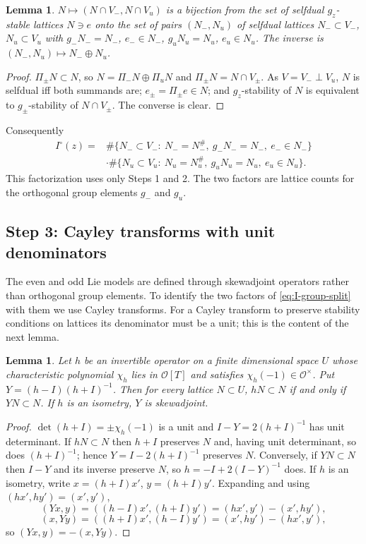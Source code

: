 \documentclass[11pt,oneside,notitlepage]{book}
\numberwithin{equation}{section}
\theoremstyle{plain}
\newtheorem{lemma}[theorem]{Lemma}
\theoremstyle{definition}
\newcommand{\cO}{\mathcal{O}}
\begin{document}
\begin{lemma}\label{lem:Nsplit}
$N\mapsto(N\cap V_-,N\cap V_u)$ is a bijection from the set of selfdual $g_z$-stable lattices $N\ni e$ onto the set of pairs $(N_-,N_u)$ of selfdual lattices $N_-\subset V_-$, $N_u\subset V_u$ with $g_-N_-=N_-$, $e_-\in N_-$, $g_uN_u=N_u$, $e_u\in N_u$. The inverse is $(N_-,N_u)\mapsto N_-\oplus N_u$.
\end{lemma}
\begin{proof}
$\Pi_\pm N\subset N$, so $N=\Pi_-N\oplus\Pi_uN$ and $\Pi_\pm N=N\cap V_\pm$. As $V=V_-\perp V_u$, $N$ is selfdual iff both summands are; $e_\pm=\Pi_\pm e\in N$; and $g_z$-stability of $N$ is equivalent to $g_\pm$-stability of $N\cap V_\pm$. The converse is clear.
\end{proof}

Consequently
\begin{equation}\label{eq:I-group-split}
\begin{aligned}
I^\circ(z)={}&\#\{N_-\subset V_-:\ N_-=N_-^\#,\ g_-N_-=N_-,\ e_-\in N_-\}\\
&\cdot\#\{N_u\subset V_u:\ N_u=N_u^\#,\ g_uN_u=N_u,\ e_u\in N_u\}.
\end{aligned}
\end{equation}
This factorization uses only Steps 1 and 2. The two factors are lattice counts for the orthogonal group elements $g_-$ and $g_u$.

\subsection*{Step 3: Cayley transforms with unit denominators}

The even and odd Lie models are defined through skewadjoint operators rather than orthogonal group elements. To identify the two factors of \eqref{eq:I-group-split} with them we use Cayley transforms. For a Cayley transform to preserve stability conditions on lattices its denominator must be a unit; this is the content of the next lemma.

\begin{lemma}\label{lem:cayley}
Let $h$ be an invertible operator on a finite dimensional space $U$ whose characteristic polynomial $\chi_h$ lies in $\cO[T]$ and satisfies $\chi_h(-1)\in\cO^\times$. Put $Y=(h-I)(h+I)^{-1}$. Then for every lattice $N\subset U$, $hN\subset N$ if and only if $YN\subset N$. If $h$ is an isometry, $Y$ is skewadjoint.
\end{lemma}
\begin{proof}
$\det(h+I)=\pm\chi_h(-1)$ is a unit and $I-Y=2(h+I)^{-1}$ has unit determinant. If $hN\subset N$ then $h+I$ preserves $N$ and, having unit determinant, so does $(h+I)^{-1}$; hence $Y=I-2(h+I)^{-1}$ preserves $N$. Conversely, if $YN\subset N$ then $I-Y$ and its inverse preserve $N$, so $h=-I+2(I-Y)^{-1}$ does. If $h$ is an isometry, write $x=(h+I)x'$, $y=(h+I)y'$. Expanding and using $(hx',hy')=(x',y')$,
\[(Yx,y)=((h-I)x',(h+I)y')=(hx',y')-(x',hy'),\]\[(x,Yy)=((h+I)x',(h-I)y')=(x',hy')-(hx',y'),\]
so $(Yx,y)=-(x,Yy)$.
\end{proof}
\end{document}
